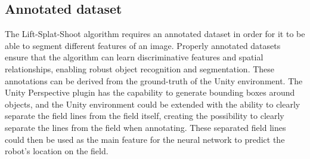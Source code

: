 \documentclass{uva-inf-bachelor-thesis}
\begin{document}
        \subsection{Annotated dataset}
            The Lift-Splat-Shoot algorithm requires an annotated dataset in order for it to be able to segment different features of an image. Properly annotated datasets ensure that the algorithm can learn discriminative features and spatial relationships, enabling robust object recognition and segmentation. These annotations can be derived from the ground-truth of the Unity environment. The Unity Perspective plugin has the capability to generate bounding boxes around objects, and the Unity environment could be extended with the ability to clearly separate the field lines from the field itself, creating the possibility to clearly separate the lines from the field when annotating. These separated field lines could then be used as the main feature for the neural network to predict the robot's location on the field. 
            
\end{document}
